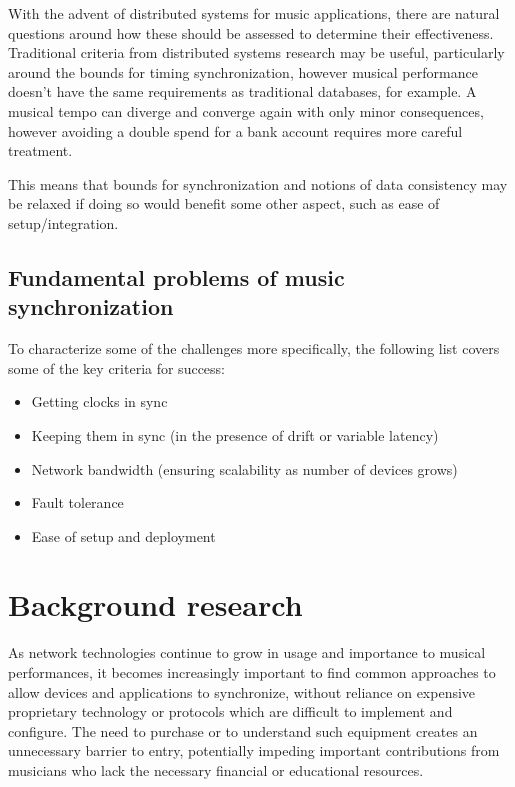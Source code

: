 \documentclass[11pt]{article} %
\theoremstyle{plain}
\theoremstyle{definition}
\begin{document}
With the advent of distributed systems for music applications, there are
natural questions around how these should be assessed to determine their
effectiveness. Traditional criteria from distributed systems research may be
useful, particularly around the bounds for timing synchronization, however
musical performance doesn't have the same requirements as traditional
databases, for example. A musical tempo can diverge and converge again with
only minor consequences, however avoiding a double spend for a bank account
requires more careful treatment.

This means that bounds for synchronization and notions of data consistency may
be relaxed if doing so would benefit some other aspect, such as ease of
setup/integration.

\subsection{Fundamental problems of music synchronization}

To characterize some of the challenges more specifically, the following list
covers some of the key criteria for success:

\begin{itemize}
  \item Getting clocks in sync \cite[Chapter~6.3.2]{attiya2004distributed}
  \item Keeping them in sync (in the presence of drift or variable latency) \cite[Chapter~13]{attiya2004distributed}
  \item Network bandwidth (ensuring scalability as number of devices grows)
  \item Fault tolerance %
  \item Ease of setup and deployment
\end{itemize}

\section{Background research}

As network technologies continue to grow in usage and importance to musical
performances\cite{madgwick2015simple}, it becomes increasingly important to
find common approaches to allow devices and applications to synchronize, without
reliance on expensive proprietary technology or protocols which are difficult to
implement and configure. The need to purchase or to understand such equipment
creates an unnecessary barrier to entry, potentially impeding important
contributions from musicians who lack the necessary financial or educational
resources.
\end{document}
